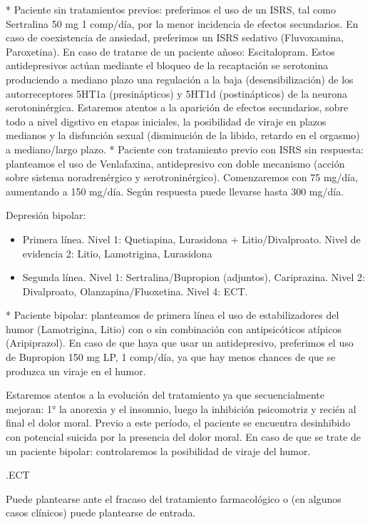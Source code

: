 \documentclass{scrbook}
\begin{document}
* Paciente sin tratamientos previos: preferimos el uso de un ISRS, tal como Sertralina 50 mg 1 comp/día, por la menor incidencia de efectos secundarios. En caso de coexistencia de ansiedad, preferimos un ISRS sedativo (Fluvoxamina, Paroxetina). En caso de tratarse de un paciente añoso: Escitalopram. Estos antidepresivos actúan mediante el bloqueo de la recaptación se serotonina produciendo a mediano plazo una regulación a la baja (desensibilización) de los autorreceptores 5HT1a (presinápticos) y 5HT1d (postinápticos) de la neurona serotoninérgica. Estaremos atentos a la aparición de efectos secundarios, sobre todo a nivel digstivo en etapas iniciales, la posibilidad de viraje en plazos medianos y la disfunción sexual (disminución de la libido, retardo en el orgasmo) a mediano/largo plazo.
* Paciente con tratamiento previo con ISRS sin respuesta: planteamos el uso de Venlafaxina, antidepresivo con doble mecanismo (acción sobre sistema noradrenérgico y serotroninérgico). Comenzaremos con 75 mg/día, aumentando a 150 mg/día. Según respuesta puede llevarse hasta 300 mg/día.

Depresión bipolar:
\begin{itemize}
	\item Primera línea. Nivel 1: Quetiapina, Lurasidona + Litio/Divalproato. Nivel de evidencia 2: Litio, Lamotrigina, Lurasidona
	\item Segunda línea. Nivel 1: Sertralina/Bupropion (adjuntos), Cariprazina. Nivel 2: Divalproato, Olanzapina/Fluoxetina. Nivel 4: ECT. 
\end{itemize}
* Paciente bipolar: planteamos de primera línea el uso de estabilizadores del humor (Lamotrigina, Litio) con o sin combinación con antipsicóticos atípicos (Aripiprazol). En caso de que haya que usar un antidepresivo, preferimos el uso de Bupropion 150 mg LP, 1 comp/día, ya que hay menos chances de que se produzca un viraje en el humor.

Estaremos atentos a la evolución del tratamiento ya que secuencialmente mejoran: 1° la anorexia y el insomnio, luego la inhibición psicomotriz y recién al final el dolor moral. Previo a este período, el paciente se encuentra desinhibido con potencial suicida por la presencia del dolor moral. En caso de que se trate de un paciente bipolar: controlaremos la posibilidad de viraje del humor.

.ECT

Puede plantearse ante el fracaso del tratamiento farmacológico o (en algunos casos clínicos) puede plantearse de entrada.
\end{document}
